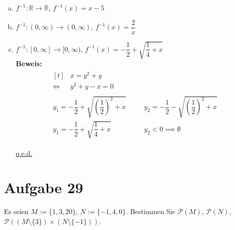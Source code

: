 \documentclass[10pt, oneside]{article}
\begin{document}
\begin{enumerate}[(a)]
    \item $f^{-1} : \mathbb{R} \rightarrow \mathbb{R}$, $f^{-1}(x) = x - 5$
    \item $f^{-1} : (0, \infty) \rightarrow (0, \infty)$, $f^{-1}(x) = \dfrac{2}{x}$
    \item $f^{-1} : [0, \infty] \rightarrow [0, \infty)$, $f^{-1}(x) = -\dfrac{1}{2} + \sqrt{\dfrac{1}{4} + x}$ \\[5pt]
        \textbf{Beweis:}\\[2pt]
        \begin{equation*}
            \begin{gathered}
                \begin{aligned}[t]
                          &x = y^2 + y \\[5pt]
                    \iff\ &y^2 + y - x = 0
                \end{aligned} \\[10pt]
                \begin{array}{lcl}
                    y_{1} = - \dfrac{1}{2} + \sqrt{\left(\dfrac{1}{2}\right)^2 + x} &\quad& y_{2} = - \dfrac{1}{2} - \sqrt{\left(\dfrac{1}{2}\right)^2 + x} \\[15pt]
                    y_1   = - \dfrac{1}{2} + \sqrt{\dfrac{1}{4} + x} && y_{2} < 0 \implies \emptyset
                \end{array}
            \end{gathered}
        \end{equation*}
        \vspace{3pt}
        \begin{center}
            \underline{q.e.d.}
        \end{center}
\end{enumerate}

\pagebreak
\section{Aufgabe 29}

Es seien $M := \{1, 3, 20\}$, $N := \{-1, 4, 0\}$. Bestimmen Sie
$\mathcal{P}(M)$, $\mathcal{P}(N)$, $\mathcal{P}((M \setminus \{3\}) \times (N
\setminus \{-1\}))$.
\end{document}
